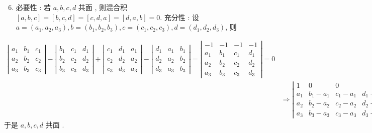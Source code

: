 \documentclass[10pt]{article}
\begin{document}
\begin{enumerate}
  \setcounter{enumi}{5}
  \item  必要性 :  若  $a, b, c, d$  共面 ,  则混合积  $[a, b, c]=[b, c, d]=[c, d, a]=[d, a, b]=0$.  充分性 :  设  $a=\left(a_{1}, a_{2}, a_{3}\right), b=\left(b_{1}, b_{2}, b_{3}\right), c=\left(c_{1}, c_{2}, c_{3}\right), d=\left(d_{1}, d_{2}, d_{3}\right)$,  则 
\end{enumerate}
$$
\begin{aligned}
\left|\begin{array}{lll}
a_{1} & b_{1} & c_{1} \\
a_{2} & b_{2} & c_{2} \\
a_{3} & b_{3} & c_{3}
\end{array}\right|-\left|\begin{array}{lll}
b_{1} & c_{1} & d_{1} \\
b_{2} & c_{2} & d_{2} \\
b_{3} & c_{3} & d_{3}
\end{array}\right|+\left|\begin{array}{ccc}
c_{1} & d_{1} & a_{1} \\
c_{2} & d_{2} & a_{2} \\
c_{3} & d_{3} & a_{3}
\end{array}\right|-\left|\begin{array}{ccc}
d_{1} & a_{1} & b_{1} \\
d_{2} & a_{2} & b_{2} \\
d_{3} & a_{3} & b_{3}
\end{array}\right|=\left|\begin{array}{cccc}
-1 & -1 & -1 & -1 \\
a_{1} & b_{1} & c_{1} & d_{1} \\
a_{2} & b_{2} & c_{2} & d_{2} \\
a_{3} & b_{3} & c_{3} & d_{3}
\end{array}\right|=0 \\
& \Longrightarrow\left|\begin{array}{cccc}
1 & 0 & 0 \\
a_{1} & b_{1}-a_{1} & c_{1}-a_{1} & d_{1}-a_{1} \\
a_{2} & b_{2}-a_{2} & c_{2}-a_{2} & d_{2}-a_{2} \\
a_{3} & b_{3}-a_{3} & c_{3}-a_{3} & d_{3}-a_{3}
\end{array}\right|=0
\end{aligned}
$$
 于是  $a, b, c, d$  共面 .
\end{document}
